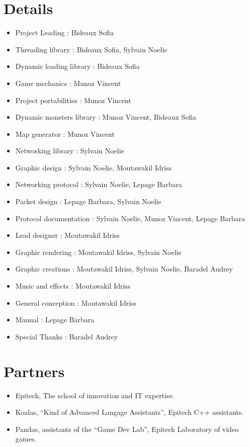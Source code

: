 \documentclass{koala-fr}
\begin{document}
\section{ Details}

\begin{itemize}
  \item Project Leading : Bideaux Sofia
  \item Threading library : Bideaux Sofia, Sylvain Noelie
  \item Dynamic loading library : Bideaux Sofia
  \item Game mechanics : Munoz Vincent
  \item Project portabilities : Munoz Vincent
  \item Dynamic monsters library : Munoz Vincent, Bideaux Sofia
  \item Map generator : Munoz Vincent
  \item Networking library : Sylvain Noelie
  \item Graphic design : Sylvain Noelie, Moutawakil Idriss
  \item Networking protocol : Sylvain Noelie, Lepage Barbara
  \item Packet design : Lepage Barbara, Sylvain Noelie
  \item Protocol documentation : Sylvain Noelie, Munoz Vincent, Lepage Barbara
  \item Lead designer : Moutawakil Idriss
  \item Graphic rendering : Moutawakil Idriss, Sylvain Noelie
  \item Graphic creations : Moutawakil Idriss, Sylvain Noelie, Baradel Audrey
  \item Music and effects : Moutawakil Idriss
  \item General conception : Moutawakil Idriss
  \item Manual : Lepage Barbara
  \item Special Thanks : Baradel Audrey
\end{itemize}

\section{ Partners}

\begin{itemize}
  \item Epitech, The school of innovation and IT expertise.
  \item Koalas, ``Kind of Advanced Langage Assistants'', Epitech C++ assistants.
  \item Pandas, assistants of the ``Game Dev Lab'', Epitech Laboratory of video games.
\end{itemize}
\end{document}
